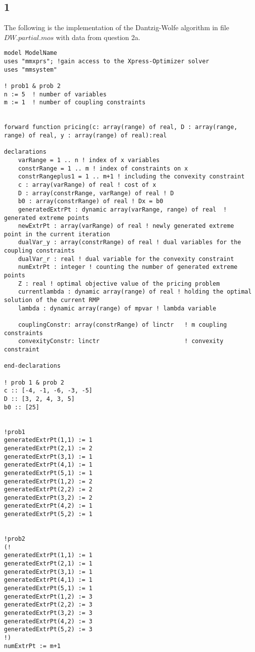 \documentclass[twoside,12pt]{article}
\begin{document}
\subsection{1}
\label{p3_q1}
The following is the implementation of the Dantzig-Wolfe algorithm in file $DW.partial.mos$ with data  from question 2a.
\\
\begin{verbatim}
model ModelName
uses "mmxprs"; !gain access to the Xpress-Optimizer solver
uses "mmsystem"

! prob1 & prob 2
n := 5  ! number of variables
m := 1  ! number of coupling constraints


forward function pricing(c: array(range) of real, D : array(range, range) of real, y : array(range) of real):real

declarations
	varRange = 1 .. n ! index of x variables
	constrRange = 1 .. m ! index of constraints on x
	constrRangeplus1 = 1 .. m+1 ! including the convexity constraint
	c : array(varRange) of real ! cost of x
	D : array(constrRange, varRange) of real ! D
	b0 : array(constrRange) of real ! Dx = b0
    generatedExtrPt : dynamic array(varRange, range) of real  ! generated extreme points
    newExtrPt : array(varRange) of real ! newly generated extreme point in the current iteration
    dualVar_y : array(constrRange) of real ! dual variables for the coupling constraints
    dualVar_r : real ! dual variable for the convexity constraint
    numExtrPt : integer ! counting the number of generated extreme points
    Z : real ! optimal objective value of the pricing problem
    currentlambda : dynamic array(range) of real ! holding the optimal solution of the current RMP
    lambda : dynamic array(range) of mpvar ! lambda variable
    
    couplingConstr: array(constrRange) of linctr   ! m coupling constraints
    convexityConstr: linctr                        ! convexity constraint
    
end-declarations

! prob 1 & prob 2
c :: [-4, -1, -6, -3, -5]
D :: [3, 2, 4, 3, 5]
b0 :: [25]


!prob1
generatedExtrPt(1,1) := 1
generatedExtrPt(2,1) := 2
generatedExtrPt(3,1) := 1
generatedExtrPt(4,1) := 1
generatedExtrPt(5,1) := 1
generatedExtrPt(1,2) := 2
generatedExtrPt(2,2) := 2
generatedExtrPt(3,2) := 2
generatedExtrPt(4,2) := 1
generatedExtrPt(5,2) := 1


!prob2
(!
generatedExtrPt(1,1) := 1
generatedExtrPt(2,1) := 1
generatedExtrPt(3,1) := 1
generatedExtrPt(4,1) := 1
generatedExtrPt(5,1) := 1
generatedExtrPt(1,2) := 3
generatedExtrPt(2,2) := 3
generatedExtrPt(3,2) := 3
generatedExtrPt(4,2) := 3
generatedExtrPt(5,2) := 3
!)
numExtrPt := m+1 


\end{verbatim}
\end{document}
